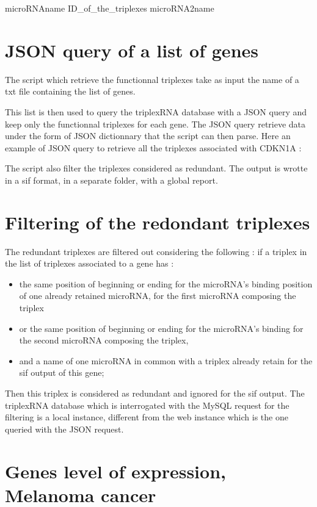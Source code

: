 \documentclass[a4paper,12pt]{report}
\begin{document}
microRNAname ID\_of\_the\_triplexes microRNA2name

\section{JSON query of a list of genes}

The script which retrieve the functionnal triplexes take as input the name of a txt file containing the list of genes.

This list is then used to query the triplexRNA database with a JSON query and keep only the functionnal triplexes for each gene. The JSON query retrieve data under the form of JSON dictionnary that the script can then parse. Here an example of JSON query to retrieve all the triplexes associated with CDKN1A :



The script also filter the triplexes considered as redundant. The output is wrotte in a sif format, in a separate folder, with a global report.

\section{Filtering of the redondant triplexes}

The redundant triplexes are filtered out considering the following : if a triplex in the list of triplexes associated to a gene has : 
\begin{itemize}
	\item the same position of beginning or ending for the microRNA's binding position of one already retained microRNA, for the first microRNA composing the triplex
	\item or the same position of beginning or ending for the microRNA's binding for the second microRNA composing the triplex, 
	\item and a name of one microRNA in common with a triplex already retain for the sif output of this gene;
\end{itemize}

Then this triplex is considered as redundant and ignored for the sif output.
The triplexRNA database which is interrogated with the MySQL request for the filtering is a local instance, different from the web instance which is the one queried with the JSON request. 

\section{Genes level of expression, Melanoma cancer}
\end{document}

